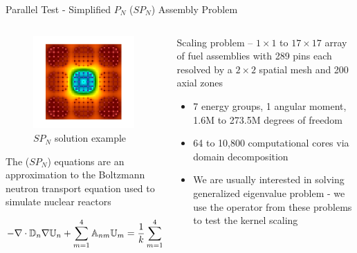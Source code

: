 \documentclass{beamer}
\begin{document}
\begin{frame}{Parallel Test - Simplified $P_N$ ($SP_N$) Assembly Problem}
\small
\begin{columns}
  
    \begin{column}{0.55\textwidth}

      \vspace{-0.2in}
      \begin{figure}
        \centering
        \includegraphics[width=2.0in]{prob4}
        \vspace{-0.2in}
        \caption{$SP_N$ solution example}
      \end{figure}

      The ($SP_N$) equations are an approximation to the Boltzmann neutron
      transport equation used to simulate nuclear reactors

      \vspace{-0.2in}
      
      \[
        \small
        -\nabla \cdot \mathbb{D}_n \nabla \mathbb{U}_n + \sum_{m=1}^4
        \mathbb{A}_{nm} \mathbb{U}_m = \frac{1}{k} \sum_{m=1}^4
        \mathbb{F}_{nm} \mathbb{U}_m
      \]

    \end{column}

    \begin{column}{0.45\textwidth}
      Scaling problem -- $1 \times 1$ to $17 \times 17$ array of fuel
      assemblies with 289 pins each resolved by a $2 \times 2$ spatial mesh
      and 200 axial zones

      \vfill
      
      \begin{itemize}
      \item 7 energy groups, 1 angular moment, 1.6M to 273.5M degrees of
        freedom
      \item 64 to 10,800 computational cores via domain decomposition
      \item We are usually interested in solving generalized eigenvalue
        problem - we use the operator from these problems to test the kernel
        scaling 
      \end{itemize}
    \end{column}
    
  \end{columns}

\end{frame}
\end{document}
